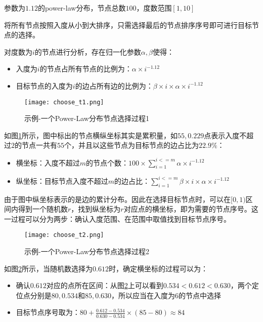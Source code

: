 \begin{example}
  \label{exa:choose_t_graph}
  参数为$1.12$的power-law分布，节点总数$100$，度数范围$[1, 10]$
  
  将所有节点按照入度从小到大排序，只需选择最后的节点排序序号即可进行目标节点的选择。

  对度数为$i$的节点进行分析，存在归一化参数$\alpha, \beta$使得：
  
  \begin{itemize}
    \item 入度为$i$的节点占所有节点的比例为：$\alpha \times i^{-1.12}$
    \item 目标节点的入度为$i$的边占所有边的比例为：$\beta \times i \times \alpha \times i^{-1.12}$
  \end{itemize}

\vspace{0.2cm}

  \begin{figure}
    \centering
    \texttt{[image: choose\_t1.png]}
    \caption{示例-一个Power-Law分布节点选择过程1}
    \label{fig:target_node_choose1}
  \end{figure}
  
  如图\ref{fig:target_node_choose1}所示，图中标出的节点横纵坐标其实是累积量，如$55, 0.229$点表示入度不超过$2$的节点一共有$55$个，并且以这些节点为目标节点的边占比为$22.9\%$：
  
  \begin{itemize}
    \item 横坐标：入度不超过$m$的节点个数：$100 \times \sum\limits_{i = 1}^{i <= m} \alpha \times i^{-1.12}$
    \item 纵坐标：目标节点入度不超过$m$的边占比：$\sum\limits_{i = 1}^{i <= m} \beta \times i \times \alpha \times i^{-1.12}$
  \end{itemize}

\vspace{0.2cm}

  由于图中纵坐标表示的是边的累计分布。因此在选择目标节点时，可以在$[0, 1)$区间内得到一个随机数$r$，找到纵坐标为$r$对应点的横坐标，即为需要的节点序号。这一过程可以分为两步：确认入度范围、在范围中取值找到目标节点序号。

  \begin{figure}
    \centering
    \texttt{[image: choose\_t2.png]}
    \caption{示例-一个Power-Law分布节点选择过程2}
    \label{fig:target_node_choose2}
  \end{figure}
  
  如图\ref{fig:target_node_choose2}所示，当随机数选择为$0.612$时，确定横坐标的过程可以为：

  \begin{itemize}
    \item 确认$0.612$对应的点所在区间：从图\ref{fig:target_node_choose2}上可以看到$0.534<0.612<0.630$，两个定位点分别是$80, 0.534$和$85, 0.630$，所以应当在入度为$6$的节点中选择
    \item 目标节点序号取为：$80+\frac{0.612-0.534}{0.630-0.534} \times(85-80) \approx 84$
  \end{itemize}
\end{example}

